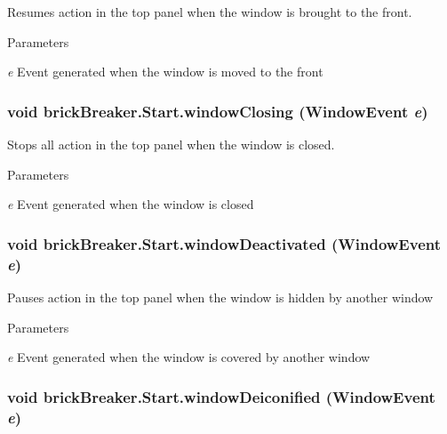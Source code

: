 Resumes action in the top panel when the window is brought to the front. 
\begin{DoxyParams}{Parameters}
\item[{\em e}]Event generated when the window is moved to the front \end{DoxyParams}
\hypertarget{classbrick_breaker_1_1_start_a11168f9afbcfc8cac2b7570a3a0dfa09}{
\subsubsection[{windowClosing}]{\setlength{\rightskip}{0pt plus 5cm}void brickBreaker.Start.windowClosing (WindowEvent {\em e})}}
\label{classbrick_breaker_1_1_start_a11168f9afbcfc8cac2b7570a3a0dfa09}
Stops all action in the top panel when the window is closed. 
\begin{DoxyParams}{Parameters}
\item[{\em e}]Event generated when the window is closed \end{DoxyParams}
\hypertarget{classbrick_breaker_1_1_start_ac2c1907f281e5cc6abf558789c8946b3}{
\subsubsection[{windowDeactivated}]{\setlength{\rightskip}{0pt plus 5cm}void brickBreaker.Start.windowDeactivated (WindowEvent {\em e})}}
\label{classbrick_breaker_1_1_start_ac2c1907f281e5cc6abf558789c8946b3}
Pauses action in the top panel when the window is hidden by another window 
\begin{DoxyParams}{Parameters}
\item[{\em e}]Event generated when the window is covered by another window \end{DoxyParams}
\hypertarget{classbrick_breaker_1_1_start_a7a77b64bcea5b507ae49463baa3f0282}{
\subsubsection[{windowDeiconified}]{\setlength{\rightskip}{0pt plus 5cm}void brickBreaker.Start.windowDeiconified (WindowEvent {\em e})}}

